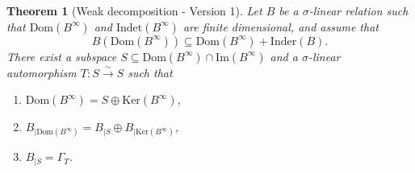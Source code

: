 \documentclass[12pt]{amsart}
\newtheorem{theorem}{Theorem}[section]
\theoremstyle{definition}
\newcommand{\<}{\langle}   %
\renewcommand{\>}{\rangle} %
\begin{document}
\begin{theorem}[Weak decomposition - Version 1]\label{WeakDecomposition1}
    Let $B$ be a $\sigma$-linear relation such that $\mathrm{Dom}(B^{\infty})$ and $\mathrm{Indet}(B^{\infty})$ are finite dimensional, and assume that 
    $$B(\mathrm{Dom}(B^{\infty})) \subseteq  \mathrm{Dom}(B^{\infty}) + \mathrm{Inder}(B).$$ 
    There exist a subspace $S \subseteq  \mathrm{Dom}(B^{\infty}) \cap \mathrm{Im}(B^{\infty})$ and a $\sigma$-linear automorphism $T:S\xrightarrow{\sim} S$ such that 
    \begin{enumerate}
        \item $\mathrm{Dom}(B^{\infty}) = S \oplus \mathrm{Ker}(B^{\infty})$,
        \item $B_{|\mathrm{Dom}(B^{\infty})} = B_{|S} \oplus B_{|\mathrm{Ker}(B^{\infty})}$,
        \item $B_{|S} = \Gamma_T$.
    \end{enumerate}
\end{theorem}
\end{document}
